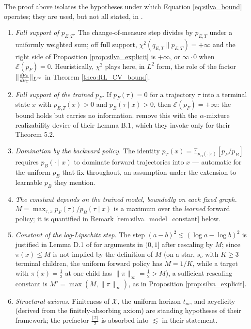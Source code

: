 \begin{remark}\label{rem:silva_hypotheses}
The proof above isolates the hypotheses under which Equation \eqref{eq:silva_bound} operates; they are used, but not all stated, in \citet{silvageneralization}.
\begin{enumerate}
    \item \emph{Full support of $p_{E,T}$.} The change-of-measure step divides by $p_{E,T}$ under a uniformly weighted sum; off full support, $\chi^2(q_{E,T}\|p_{E,T}) = +\infty$ and the right side of Proposition \ref{prop:silva_explicit} is $+\infty$, or $\infty\cdot0$ when $\mathcal E(p_F)=0$. Heuristically, $\chi^2$ plays here, in $L^2$ form, the role of the factor $\|\frac{d\nu_{\mathrm{B}}}{d\nu_{\mathrm{T}}}\|_{L^\infty}$ in Theorem \ref{theo:RL_CV_bound}.
    \item \emph{Full support of the trained $p_F$.} If $p_F(\tau)=0$ for a trajectory $\tau$ into a terminal state $x$ with $p_{E,T}(x)>0$ and $p_B(\tau\mid x)>0$, then $\mathcal E(p_F)=+\infty$: the bound holds but carries no information. \citet{silvageneralization} remove this with the $\alpha$-mixture realizability device of their Lemma B.1, which they invoke only for their Theorem 5.2.
    \item \emph{Domination by the backward policy.} The identity $p_T(x)=\mathbb E_{p_B(\cdot|x)}[p_F/p_B]$ requires $p_B(\cdot\mid x)$ to dominate forward trajectories into $x$ --- automatic for the uniform $p_B$ that \citet{silvageneralization} fix throughout, an assumption under the extension to learnable $p_B$ they mention.
    \item \emph{The constant depends on the trained model, boundedly on each fixed graph.} $M=\max_{\tau,x} p_F(\tau)/p_B(\tau\mid x)$ is a maximum over the \emph{learned} forward policy; it is quantified in Remark \ref{rem:silva_model_constant} below.
    \item \emph{Constant of the log-Lipschitz step.} The step $(a-b)^2\lesssim (\log a - \log b)^2$ is justified in Lemma D.1 of \citet{silvageneralization} for arguments in $(0,1]$ after rescaling by $M$; since $\pi(x) \leq M$ is not implied by the definition of $M$ (on a star, $s_o$ with $K\geq3$ terminal children, the uniform forward policy has $M=1/K$, while a target with $\pi(x)=\tfrac12$ at one child has $\|\pi\|_\infty=\tfrac12>M$), a sufficient rescaling constant is $M'=\max(M,\|\pi\|_\infty)$, as in Proposition \ref{prop:silva_explicit}.
    \item \emph{Structural axioms.} Finiteness of $\mathcal X$, the uniform horizon $t_m$, and acyclicity (derived from the finitely-absorbing axiom) are standing hypotheses of their framework; the prefactor $\frac{|\mathcal X|}{2}$ is absorbed into $\lesssim$ in their statement.
\end{enumerate}
\end{remark}

